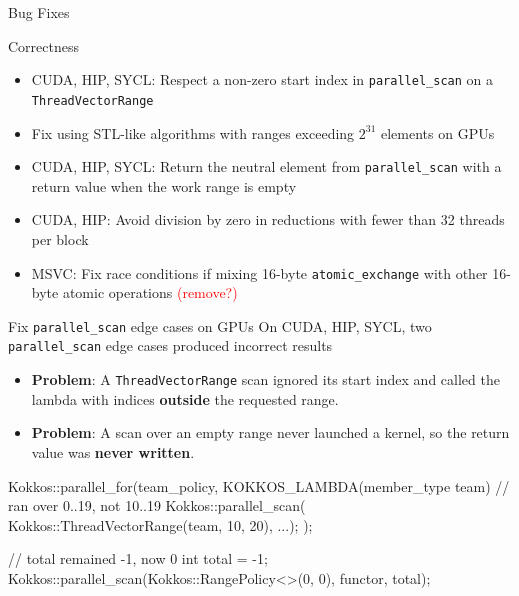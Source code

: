 
\begin{frame}[fragile]

  {\Huge Bug Fixes}

  \vspace{10pt}

\end{frame}


\begin{frame}[fragile]{Correctness}
  \begin{itemize}
    \item CUDA, HIP, SYCL: Respect a non-zero start index in \texttt{parallel\_scan} on a \texttt{ThreadVectorRange}
    \item Fix using STL-like algorithms with ranges exceeding $2^{31}$ elements on GPUs
    \item CUDA, HIP, SYCL: Return the neutral element from \texttt{parallel\_scan} with a return value when the work range is empty
    \item CUDA, HIP: Avoid division by zero in reductions with fewer than 32 threads per block
    \item MSVC: Fix race conditions if mixing 16-byte \texttt{atomic\_exchange} with other 16-byte atomic operations \textcolor{red}{(remove?)}
  \end{itemize}
\end{frame}


\begin{frame}[fragile]{Fix \texttt{parallel\_scan} edge cases on GPUs}
  On CUDA, HIP, SYCL, two \texttt{parallel\_scan} edge cases produced incorrect results
  \begin{itemize}
    \item \textbf{Problem}: A \texttt{ThreadVectorRange} scan ignored its start index and called the lambda with indices \textbf{outside} the requested range.
    \item \textbf{Problem}: A scan over an empty range never launched a kernel, so the return value was \textbf{never written}.
  \end{itemize}
  \begin{code}[keywords={Kokkos}]
    Kokkos::parallel_for(team_policy,
        KOKKOS_LAMBDA(member_type team) {
            // ran over 0..19, not 10..19
            Kokkos::parallel_scan(
                Kokkos::ThreadVectorRange(team, 10, 20), ...);
    });

    // total remained -1, now 0
    int total = -1;
    Kokkos::parallel_scan(Kokkos::RangePolicy<>(0, 0),
                          functor, total);
    \end{code}
\end{frame}

